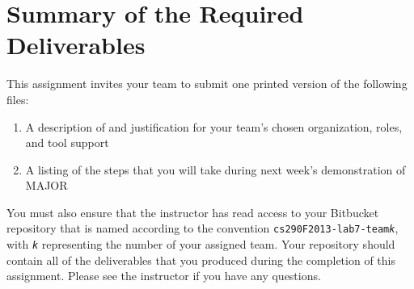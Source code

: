 % 
% 
\section*{Summary of the Required Deliverables}

This assignment invites your team to submit one printed version of the following files:
\vspace*{-.1in}
\begin{enumerate}
	\itemsep0em 
	\item A description of and justification for your team's chosen organization, roles, and tool support
	\item A listing of the steps that you will take during next week's demonstration of MAJOR
\end{enumerate}
\vspace*{-.1in}

You must also ensure that the instructor has read access to your Bitbucket repository that is named according to the
convention {\tt cs290F2013-lab7-team{\em k}}, with {\tt {\em k}} representing the number of your assigned team.  Your
repository should contain all of the deliverables that you produced during the completion of this assignment.  Please
see the instructor if you have any questions.


